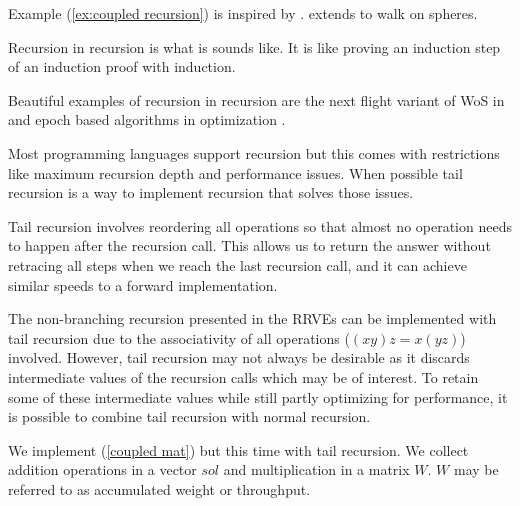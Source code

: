 \documentclass[a4paper,12pt]{article}
\begin{document}
\begin{related}
    Example (\ref{ex:coupled recursion}) is inspired by \cite{vicini_path_2021}.
    \cite{yilmazer_solving_2022} extends \cite{vicini_path_2021} to walk on spheres.
\end{related}

\begin{technique}\label{tech:recu in recu}
    Recursion in recursion is what is sounds like. It is like proving an induction
    step of an induction proof with induction.
\end{technique}

\begin{related}
    Beautiful examples of recursion in recursion are
    the next flight variant of WoS in
    \cite{sawhney_grid-free_2022} and epoch based algorithms in optimization
    \cite{gupta_convergence_2021}.
\end{related}

Most programming languages support recursion but this comes with restrictions
like maximum recursion depth and performance issues. When possible tail recursion is
a way to implement recursion that solves those
issues.

\begin{technique}
    Tail recursion involves reordering all operations
    so that almost no operation needs to happen after
    the recursion call. This allows us to return the
    answer without retracing all steps when we reach
    the last recursion call, and it can achieve similar
    speeds to a forward implementation.
\end{technique}

The non-branching recursion presented in the RRVEs
can be implemented with tail recursion due to the associativity of
all operations ($(xy)z = x(yz)$) involved. However, tail recursion
may not always be desirable as it discards intermediate values of
the recursion calls which may be of interest. To retain some of these intermediate
values while still partly optimizing for performance, it is possible
to combine tail recursion with normal recursion.

\begin{pythonn}
    We implement (\ref{coupled mat}) but this time with tail recursion.
    We collect addition operations in a vector $sol$ and multiplication
    in a matrix $W$. $W$ may be referred to as accumulated weight or throughput.
    \vspace{0.3cm}
\end{pythonn}
\end{document}
